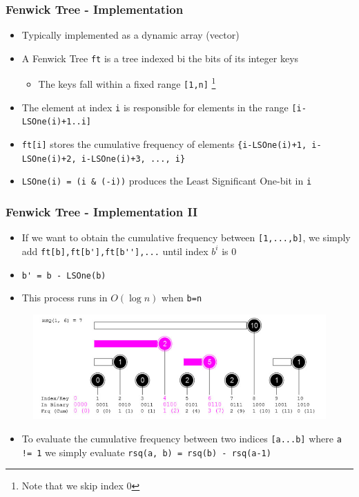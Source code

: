 \documentclass{beamer}
\begin{document}
\begin{frame}[fragile]
\frametitle{Fenwick Tree - Implementation}
	\begin{itemize}
	    \item Typically implemented as a dynamic array (vector)
	    \item A Fenwick Tree \verb|ft| is a tree indexed bi the bits of its integer keys
	    	\begin{itemize}
			    \item The keys fall within a fixed range \verb|[1,n]| \footnote{Note that we skip index 0}
			\end{itemize}
		\item The element at index \verb|i| is responsible for elements in the range \verb|[i-LSOne(i)+1..i]|
		\item \verb|ft[i]| stores the cumulative frequency of elements \verb|{i-LSOne(i)+1, i-LSOne(i)+2, i-LSOne(i)+3, ..., i}|
		\item \verb|LSOne(i) = (i & (-i))| produces the Least Significant One-bit in \verb|i|
	\end{itemize}
\end{frame}

\begin{frame}[fragile]
\frametitle{Fenwick Tree - Implementation II}
	\begin{itemize}
	    \item If we want to obtain the cumulative frequency between \verb|[1,...,b]|, we simply add \verb|ft[b],ft[b'],ft[b''],...| until index $b^i$ is $0$
	    \item \verb|b' = b - LSOne(b)|
	    \item This process runs in $O(\log n)$ when \verb|b=n|
	\end{itemize}
	\begin{figure}
	    \centering
	    \includegraphics[scale=0.3]{imgs/2.4/fenwick-tree/rsq.png}
	\end{figure}
	\begin{itemize}
	    \item To evaluate the cumulative frequency between two indices \verb|[a...b]| where \verb|a != 1| we simply evaluate \verb|rsq(a, b) = rsq(b) - rsq(a-1)|
	\end{itemize}
\end{frame}
\end{document}
